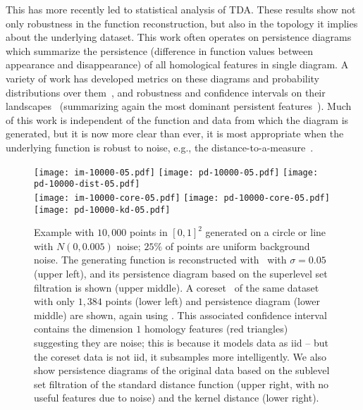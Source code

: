 \documentclass[11pt]{myclass}
\begin{document}
This has more recently led to statistical analysis of TDA.  These results show not only robustness in the function reconstruction, but also in the topology it implies about the underlying dataset.  This work often operates on persistence diagrams which summarize the persistence (difference in function values between appearance and disappearance) of all homological features in single diagram.  A variety of work has developed metrics on these diagrams and probability distributions over them~\cite{MMH11,TMMH14}, and robustness and confidence intervals on their landscapes~\cite{Bub14,FLRWBS14,CFLRSW13} (summarizing again the most dominant persistent features~\cite{CFLRW14}).  Much of this work is independent of the function and data from which the diagram is generated, but it is now more clear than ever, it is most appropriate when the underlying function is robust to noise, e.g., the distance-to-a-measure~\cite{ChazalCohen-SteinerMerigot2011}.  

\begin{figure}[h!]
\texttt{[image: im-10000-05.pdf]}
\hspace{0.01\linewidth}
\texttt{[image: pd-10000-05.pdf]}
\hspace{0.01\linewidth}
\texttt{[image: pd-10000-dist-05.pdf]}
\vspace{-.11in}
\\
\texttt{[image: im-10000-core-05.pdf]}
\hspace{0.01\linewidth}
\texttt{[image: pd-10000-core-05.pdf]}
\hspace{0.01\linewidth}
\texttt{[image: pd-10000-kd-05.pdf]}
\vspace{-.11in}
\caption{\label{fig:circleline}
\small \sffamily 
Example with $10{,}000$ points in $[0,1]^2$ generated on a circle or line with $N(0,0.005)$ noise; $25\%$ of points are uniform background noise.  The generating function is reconstructed with \kde\ with $\sigma = 0.05$ (upper left), and its persistence diagram based on the superlevel set filtration is shown (upper middle).  
A coreset~\cite{big-kde} of the same dataset with only $1{,}384$ points (lower left) and persistence diagram (lower middle) are shown, again using \kde.  This associated confidence interval contains the dimension $1$ homology features (red triangles) suggesting they are noise; this is because it models data as iid -- but the coreset data is not iid, it subsamples more intelligently.   
We also show persistence diagrams of the original data based on the sublevel set filtration of the standard distance function (upper right, with no useful features due to noise) and the kernel distance (lower right).}
\end{figure}
\end{document}
